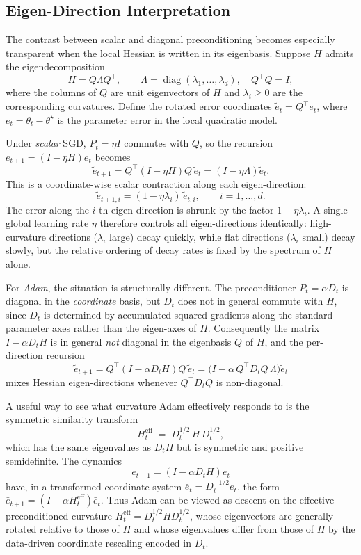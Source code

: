 \documentclass[11pt]{article}
\begin{document}
\subsection{Eigen-Direction Interpretation}
\label{sec:eigen-direction}

The contrast between scalar and diagonal preconditioning becomes especially transparent when the local Hessian is written in its eigenbasis. Suppose $H$ admits the eigendecomposition
\[
H = Q\Lambda Q^\top,
\qquad
\Lambda=\operatorname{diag}(\lambda_1,\ldots,\lambda_d),\quad Q^\top Q=I,
\]
where the columns of $Q$ are unit eigenvectors of $H$ and $\lambda_i\ge 0$ are the corresponding curvatures. Define the rotated error coordinates $\tilde e_t = Q^\top e_t$, where $e_t=\theta_t-\theta^\star$ is the parameter error in the local quadratic model.

Under \emph{scalar} SGD, $P_t=\eta I$ commutes with $Q$, so the recursion $e_{t+1}=(I-\eta H)e_t$ becomes
\[
\tilde e_{t+1}
=
Q^\top(I-\eta H)Q\,\tilde e_t
=
(I-\eta\Lambda)\tilde e_t.
\]
This is a coordinate-wise scalar contraction along each eigen-direction:
\[
\tilde e_{t+1,i}
=
(1-\eta\lambda_i)\,\tilde e_{t,i},
\qquad i=1,\ldots,d.
\]
The error along the $i$-th eigen-direction is shrunk by the factor $1-\eta\lambda_i$. A single global learning rate $\eta$ therefore controls all eigen-directions identically: high-curvature directions ($\lambda_i$ large) decay quickly, while flat directions ($\lambda_i$ small) decay slowly, but the relative ordering of decay rates is fixed by the spectrum of $H$ alone.

For \emph{Adam}, the situation is structurally different. The preconditioner $P_t=\alpha D_t$ is diagonal in the \emph{coordinate} basis, but $D_t$ does not in general commute with $H$, since $D_t$ is determined by accumulated squared gradients along the standard parameter axes rather than the eigen-axes of $H$. Consequently the matrix $I-\alpha D_t H$ is in general \emph{not} diagonal in the eigenbasis $Q$ of $H$, and the per-direction recursion
\[
\tilde e_{t+1}
=
Q^\top(I-\alpha D_t H)Q\,\tilde e_t
=
\big(I - \alpha\,Q^\top D_t Q\,\Lambda\big)\tilde e_t
\]
mixes Hessian eigen-directions whenever $Q^\top D_t Q$ is non-diagonal.

A useful way to see what curvature Adam effectively responds to is the symmetric similarity transform
\[
H_t^{\mathrm{eff}}
\;=\;
D_t^{1/2}\,H\,D_t^{1/2},
\]
which has the same eigenvalues as $D_t H$ but is symmetric and positive semidefinite. The dynamics
\[
e_{t+1}=(I-\alpha D_t H)e_t
\]
have, in a transformed coordinate system $\bar e_t=D_t^{-1/2}e_t$, the form $\bar e_{t+1}=(I-\alpha H_t^{\mathrm{eff}})\bar e_t$. Thus Adam can be viewed as descent on the effective preconditioned curvature $H_t^{\mathrm{eff}}=D_t^{1/2}HD_t^{1/2}$, whose eigenvectors are generally rotated relative to those of $H$ and whose eigenvalues differ from those of $H$ by the data-driven coordinate rescaling encoded in $D_t$.
\end{document}
